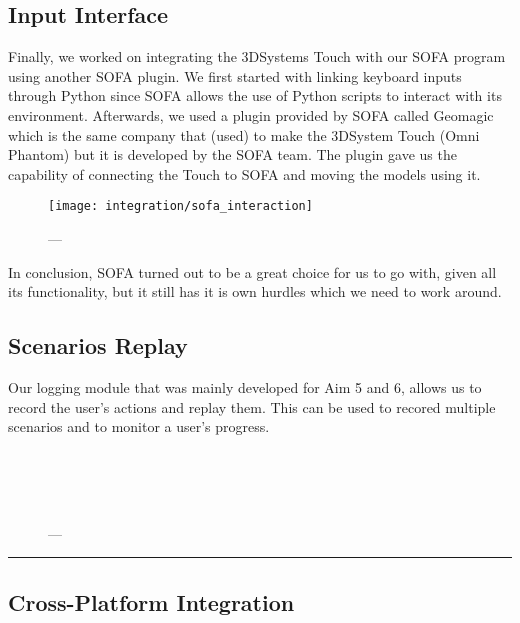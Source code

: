 \subsection{Input Interface}
Finally, we worked on integrating the 3DSystems Touch with our SOFA program using another SOFA plugin. We first started with linking keyboard inputs through Python since SOFA allows the use of Python scripts to interact with its environment. Afterwards, we used a plugin provided by SOFA called Geomagic which is the same company that (used) to make the 3DSystem Touch (Omni Phantom) but it is developed by the SOFA team. The plugin gave us the capability of connecting the Touch to SOFA and moving the models using it.

\begin{figure}
  \centering%
  \texttt{[image: integration/sofa\_interaction]}
  \caption{---}
  \label{fig:sofa_interaction}
\end{figure}

In conclusion, SOFA turned out to be a great choice for us to go with, given all its functionality, but it still has it is own hurdles which we need to work around.

\subsection{Scenarios Replay}
\label{sec:replay}
Our logging module that was mainly developed for Aim 5 and 6, allows us to record the user's actions and replay them. This can be used to recored multiple scenarios and to monitor a user's progress.


\begin{figure}
  \centering%
  \setlength{\fboxsep}{0pt}%
  \setlength{\fboxrule}{0.1pt}%
  \hfill%
  \\[1.5ex]%
  \hfill%
  \\[1.5ex]%
  \hfill%
  \\[1.5ex]%
  \caption{---}
  \label{fig:cuts}
\end{figure}

\hrule%

\subsection{Cross-Platform Integration}
\label{sec:cross}
